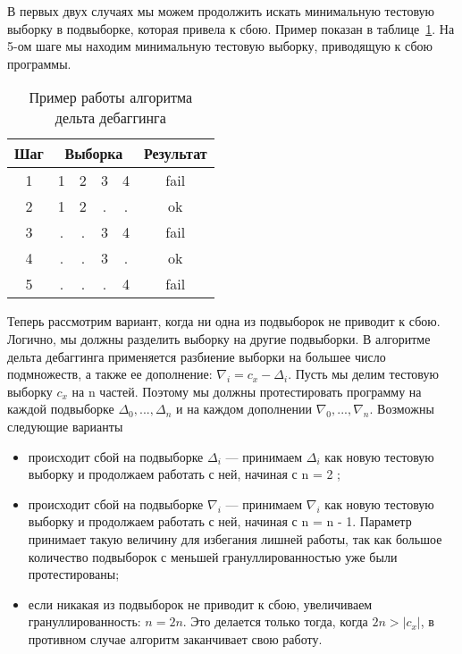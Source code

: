 В первых двух случаях мы можем продолжить искать минимальную тестовую выборку в подвыборке, которая привела к сбою. Пример показан в таблице~\ref{tab:ddminex}. На 5-ом шаге мы находим минимальную тестовую выборку, приводящую к сбою программы.
\begin{table}[]
\center
\caption{\label{tab:ddminex}Пример работы алгоритма дельта дебаггинга}
\begin{tabular}{| c | *{4}{c} | c |}
\hline
\bf Шаг & \multicolumn{4}{|c|}{\bf Выборка} & {\bf Результат}\\
\hline
1 &  1 & 2 & 3 & 4 & fail \\
\hline
2 &  1 & 2 & . & . & ok \\
\hline
3 &  . & . & 3 & 4 & fail \\
\hline
4 &  . & . & 3 & . & ok \\
\hline
5 &  . & . & . & 4 & fail \\
\hline
\end{tabular}
\end{table}

Теперь рассмотрим вариант, когда ни одна из подвыборок не приводит к сбою. Логично, мы должны разделить выборку на другие подвыборки. В алгоритме дельта дебаггинга применяется разбиение выборки на большее число подмножеств, а также ее дополнение: $\nabla_i = c_x - \Delta_i$. Пусть мы делим тестовую выборку $c_x$ на n частей. Поэтому мы должны протестировать программу на каждой подвыборке $\Delta_0,...,\Delta_n$ и на каждом дополнении $\nabla_0,...,\nabla_n$. Возможны следующие варианты
\begin{itemize}
\item происходит сбой на подвыборке $\Delta_i$ --- принимаем $\Delta_i$ как новую тестовую выборку и продолжаем работать с ней, начиная с n = 2 ;
\item происходит сбой на подвыборке $\nabla_i$ --- принимаем $\nabla_i$ как новую тестовую выборку и продолжаем работать с ней, начиная с n = n - 1. Параметр принимает такую величину для избегания лишней работы, так как большое количество подвыборок с меньшей грануллированностью уже были протестированы;
\item если никакая из подвыборок не приводит к сбою, увеличиваем грануллированность: $n = 2n$. Это делается только тогда, когда $2n > |c_x|$, в противном случае алгоритм заканчивает свою работу.
\end{itemize}

